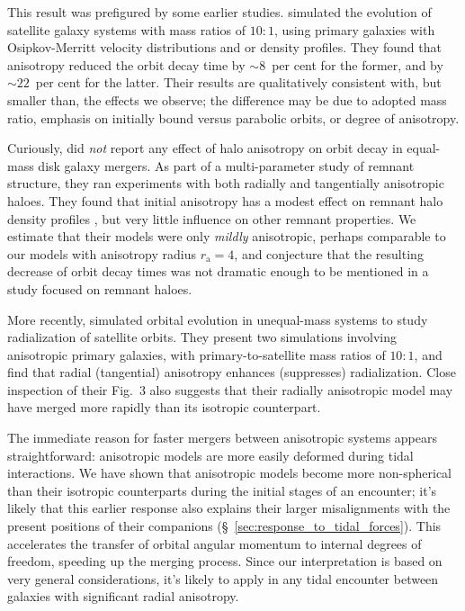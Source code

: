 \documentclass[fleqn,usenatbib]{mnras}
\begin{document}
This result was prefigured by some earlier studies. \cite{AB2007} simulated the evolution of satellite galaxy systems with mass ratios of \hbox{$10 \!:\! 1$}, using primary galaxies with Osipkov-Merritt velocity distributions and \citet{Plummer1911} or \citet{Jaffe1983} density profiles. They found that anisotropy reduced the orbit decay time by $\sim 8$~per cent for the former, and by $\sim 22$~per cent for the latter. Their results are qualitatively consistent with, but smaller than, the effects we observe; the difference may be due to adopted mass ratio, emphasis on initially bound versus parabolic orbits, or degree of anisotropy.

Curiously, \citet{McMillan2007} did \textit{not} report any effect of halo aniso\-tropy on orbit decay in equal-mass disk galaxy mergers. As part of a multi-parameter study of remnant structure, they ran experiments with both radially and tangentially anisotropic haloes. They found that initial anisotropy has a modest effect on remnant halo density profiles \citep[consistent with][]{White1979}, but very little influence on other remnant properties. We estimate that their models were only \textit{mildly} anisotropic, perhaps comparable to our models with anisotropy radius $r_\mathrm{a} = 4$, and conjecture that the resulting decrease of orbit decay times was not dramatic enough to be mentioned in a study focused on remnant haloes.

More recently, \cite{Vasiliev2022} simulated orbital evolution in unequal-mass systems to study radialization of satellite orbits. They present two simulations involving anisotropic primary galaxies, with primary-to-satellite mass ratios of $10 \!:\! 1$, and find that radial (tangential) anisotropy enhances (suppresses) radialization. Close inspection of their Fig.~3 also suggests that their radially anisotropic model may have merged more rapidly than its isotropic counterpart.

The immediate reason for faster mergers between anisotropic systems appears straightforward: anisotropic models are more easily deformed during tidal interactions. We have shown that anisotropic models become more non-spherical than their isotropic counterparts during the initial stages of an encounter; it's likely that this earlier response also explains their larger misalignments with the present positions of their companions (\S~\ref{sec:response_to_tidal_forces}). This accelerates the transfer of orbital angular momentum to internal degrees of freedom, speeding up the merging process. Since our interpretation is based on very general considerations, it's likely to apply in any tidal encounter between galaxies with significant radial anisotropy.
\end{document}
